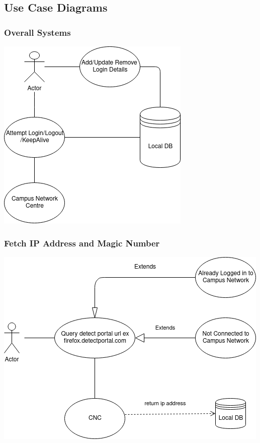 \subsection{Use Case Diagrams}
\subsubsection{Overall Systems}
\includegraphics[scale=0.7]{images/final.png}

\subsubsection{Fetch IP Address and Magic Number}
\includegraphics[scale=0.7]{images/ip.png}

